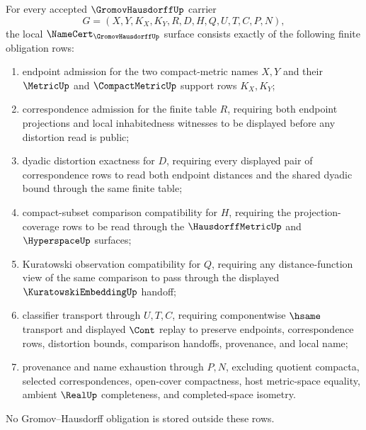\begin{theorem}
\label{thm:gromov-hausdorff-namecert-obligations}
For every accepted $\GromovHausdorffUp$ carrier
$$
G=(X,Y,K_X,K_Y,R,D,H,Q,U,T,C,P,N),
$$
the local $\NameCert_{\GromovHausdorffUp}$ surface consists exactly of the following finite obligation rows:
\begin{enumerate}
\item endpoint admission for the two compact-metric names $X,Y$ and their $\MetricUp$ and $\CompactMetricUp$ support rows $K_X,K_Y$;
\item correspondence admission for the finite table $R$, requiring both endpoint projections and local inhabitedness witnesses to be displayed before any distortion read is public;
\item dyadic distortion exactness for $D$, requiring every displayed pair of correspondence rows to read both endpoint distances and the shared dyadic bound through the same finite table;
\item compact-subset comparison compatibility for $H$, requiring the projection-coverage rows to be read through the $\HausdorffMetricUp$ and $\HyperspaceUp$ surfaces;
\item Kuratowski observation compatibility for $Q$, requiring any distance-function view of the same comparison to pass through the displayed $\KuratowskiEmbeddingUp$ handoff;
\item classifier transport through $U,T,C$, requiring componentwise $\hsame$ transport and displayed $\Cont$ replay to preserve endpoints, correspondence rows, distortion bounds, comparison handoffs, provenance, and local name;
\item provenance and name exhaustion through $P,N$, excluding quotient compacta, selected correspondences, open-cover compactness, host metric-space equality, ambient $\RealUp$ completeness, and completed-space isometry.
\end{enumerate}
No Gromov--Hausdorff obligation is stored outside these rows.
\end{theorem}
